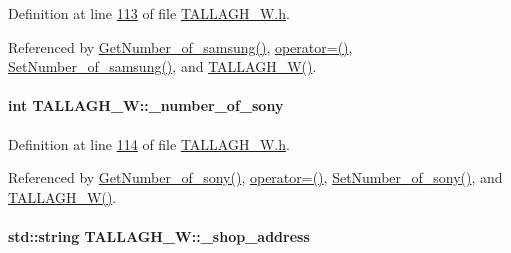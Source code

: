 Definition at line \hyperlink{_t_a_l_l_a_g_h___w_8h_source_l00113}{113} of file \hyperlink{_t_a_l_l_a_g_h___w_8h_source}{T\+A\+L\+L\+A\+G\+H\+\_\+\+W.\+h}.



Referenced by \hyperlink{_t_a_l_l_a_g_h___w_8cpp_source_l00103}{Get\+Number\+\_\+of\+\_\+samsung()}, \hyperlink{_t_a_l_l_a_g_h___w_8h_source_l00075}{operator=()}, \hyperlink{_t_a_l_l_a_g_h___w_8cpp_source_l00099}{Set\+Number\+\_\+of\+\_\+samsung()}, and \hyperlink{_t_a_l_l_a_g_h___w_8h_source_l00024}{T\+A\+L\+L\+A\+G\+H\+\_\+\+W()}.

\paragraph[{\texorpdfstring{\+\_\+number\+\_\+of\+\_\+sony}{_number_of_sony}}]{\setlength{\rightskip}{0pt plus 5cm}int T\+A\+L\+L\+A\+G\+H\+\_\+\+W\+::\+\_\+number\+\_\+of\+\_\+sony\hspace{0.3cm}{\ttfamily [private]}}\hypertarget{class_t_a_l_l_a_g_h___w_ab101d3ac8747eef48371cd9078d2366e_ab101d3ac8747eef48371cd9078d2366e}{}\label{class_t_a_l_l_a_g_h___w_ab101d3ac8747eef48371cd9078d2366e_ab101d3ac8747eef48371cd9078d2366e}


Definition at line \hyperlink{_t_a_l_l_a_g_h___w_8h_source_l00114}{114} of file \hyperlink{_t_a_l_l_a_g_h___w_8h_source}{T\+A\+L\+L\+A\+G\+H\+\_\+\+W.\+h}.



Referenced by \hyperlink{_t_a_l_l_a_g_h___w_8cpp_source_l00095}{Get\+Number\+\_\+of\+\_\+sony()}, \hyperlink{_t_a_l_l_a_g_h___w_8h_source_l00075}{operator=()}, \hyperlink{_t_a_l_l_a_g_h___w_8cpp_source_l00091}{Set\+Number\+\_\+of\+\_\+sony()}, and \hyperlink{_t_a_l_l_a_g_h___w_8h_source_l00024}{T\+A\+L\+L\+A\+G\+H\+\_\+\+W()}.

\paragraph[{\texorpdfstring{\+\_\+shop\+\_\+address}{_shop_address}}]{\setlength{\rightskip}{0pt plus 5cm}std\+::string T\+A\+L\+L\+A\+G\+H\+\_\+\+W\+::\+\_\+shop\+\_\+address\hspace{0.3cm}{\ttfamily [private]}}\hypertarget{class_t_a_l_l_a_g_h___w_a268003f2cd359fa50c6061f1ad011c67_a268003f2cd359fa50c6061f1ad011c67}{}\label{class_t_a_l_l_a_g_h___w_a268003f2cd359fa50c6061f1ad011c67_a268003f2cd359fa50c6061f1ad011c67}


